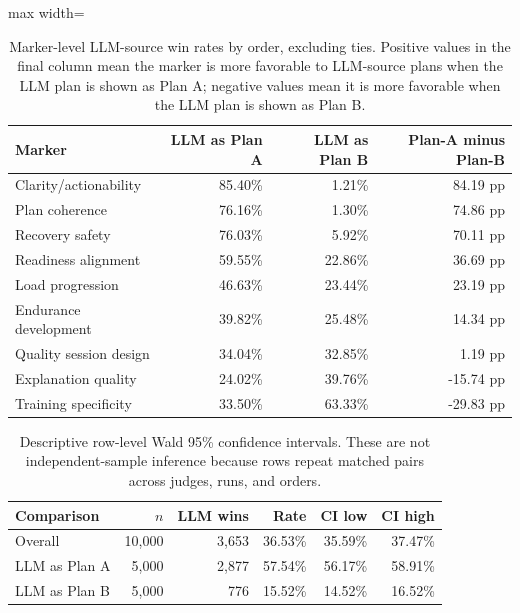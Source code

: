 \documentclass[11pt]{article}
\begin{document}
\begin{table}[H]
\centering
\small
\begin{adjustbox}{max width=\textwidth}
\begin{tabular}{lrrr}
\toprule
Marker & LLM as Plan A & LLM as Plan B & Plan-A minus Plan-B \\
\midrule
Clarity/actionability & 85.40\% & 1.21\% & 84.19 pp \\
Plan coherence & 76.16\% & 1.30\% & 74.86 pp \\
Recovery safety & 76.03\% & 5.92\% & 70.11 pp \\
Readiness alignment & 59.55\% & 22.86\% & 36.69 pp \\
Load progression & 46.63\% & 23.44\% & 23.19 pp \\
Endurance development & 39.82\% & 25.48\% & 14.34 pp \\
Quality session design & 34.04\% & 32.85\% & 1.19 pp \\
Explanation quality & 24.02\% & 39.76\% & -15.74 pp \\
Training specificity & 33.50\% & 63.33\% & -29.83 pp \\
\bottomrule
\end{tabular}
\end{adjustbox}
\caption{Marker-level LLM-source win rates by order, excluding ties. Positive values in the final column mean the marker is more favorable to LLM-source plans when the LLM plan is shown as Plan A; negative values mean it is more favorable when the LLM plan is shown as Plan B.}
\label{tab:marker-order-app}
\end{table}


\begin{table}[H]
\centering
\small
\begin{tabular}{lrrrrr}
\toprule
Comparison & $n$ & LLM wins & Rate & CI low & CI high \\
\midrule
Overall & 10,000 & 3,653 & 36.53\% & 35.59\% & 37.47\% \\
LLM as Plan A & 5,000 & 2,877 & 57.54\% & 56.17\% & 58.91\% \\
LLM as Plan B & 5,000 & 776 & 15.52\% & 14.52\% & 16.52\% \\
\bottomrule
\end{tabular}
\caption{Descriptive row-level Wald 95\% confidence intervals. These are not independent-sample inference because rows repeat matched pairs across judges, runs, and orders.}
\label{tab:uncertainty-app}
\end{table}
\end{document}
